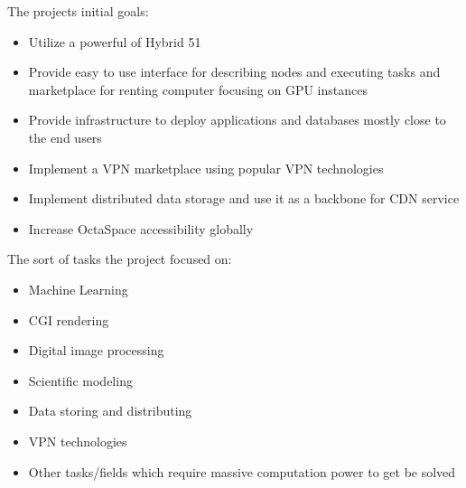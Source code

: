 The projects initial goals:

\begin{itemize}
    \item Utilize a powerful of Hybrid 51%
    \item Provide easy to use interface for describing nodes and executing tasks and marketplace for renting computer focusing on GPU instances
    \item Provide infrastructure to deploy applications and databases mostly close to the end users
    \item Implement a VPN marketplace using popular VPN technologies
    \item Implement distributed data storage and use it as a backbone for CDN service
    \item Increase OctaSpace accessibility globally
\end{itemize}

The sort of tasks the project focused on:

\begin{itemize}
    \item Machine Learning
    \item CGI rendering
    \item Digital image processing
    \item Scientific modeling
    \item Data storing and distributing
    \item VPN technologies
    \item Other tasks/fields which require massive computation power to get be solved
\end{itemize}
